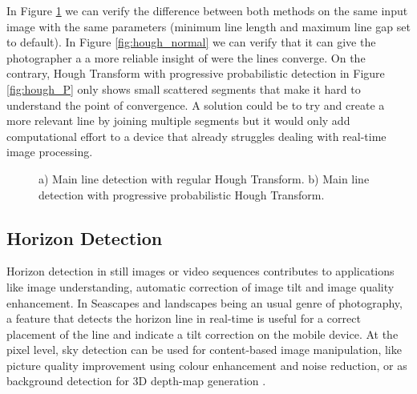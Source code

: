In Figure \ref{fig:hough_methods} we can verify the difference between both methods on the same input image with the same parameters (minimum line length and maximum line gap set to default). In Figure \ref{fig:hough_normal} we can verify that it can give the photographer a a more reliable insight of were the lines converge. On the contrary, Hough Transform with progressive probabilistic detection in Figure \ref{fig:hough_P} only shows small scattered segments that make it hard to understand the point of convergence. A solution could be to try and create a more relevant line by joining multiple segments but it would only add computational effort to a device that already struggles dealing with real-time image processing.

\begin{figure}[htbp]
	\centering
  	\caption{a) Main line detection with regular Hough Transform. b) Main line detection with progressive probabilistic Hough Transform.}
    \label{fig:hough_methods}
\end{figure}

\subsection{Horizon Detection}
\label{sub:horizon_detection}

Horizon detection in still images or video sequences contributes to applications like image understanding, automatic correction of image tilt and image quality enhancement. In Seascapes and landscapes being an usual genre of photography, a feature that detects the horizon line in real-time is useful for a correct placement of the line and indicate a tilt correction on the mobile device. At the pixel level, sky detection can be used for content-based image manipulation, like picture quality improvement using colour enhancement and noise reduction, or as background detection for 3D depth-map generation \cite{zafarifar2006blue}.

